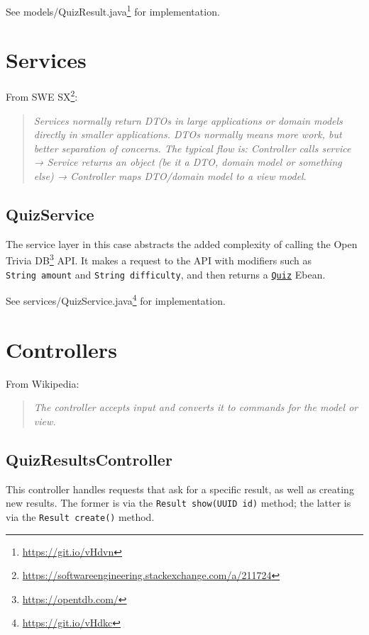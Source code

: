 \documentclass[english,a4paper,]{report}
\renewcommand{\href}[2]{#2\footnote{\url{#1}}}
\begin{document}
See \href{https://git.io/vHdvn}{models/QuizResult.java} for
implementation.

\section{Services}\label{services}

From \href{https://softwareengineering.stackexchange.com/a/211724}{SWE
SX}:

\begin{quote}
\emph{Services normally return DTOs in large applications or domain
models directly in smaller applications. DTOs normally means more work,
but better separation of concerns. The typical flow is: Controller calls
service → Service returns an object (be it a DTO, domain model or
something else) → Controller maps DTO/domain model to a view model}.
\end{quote}

\subsection{QuizService}\label{quizservice}

The service layer in this case abstracts the added complexity of calling
the \href{https://opentdb.com/}{Open Trivia DB} API. It makes a request
to the API with modifiers such as \texttt{String\ amount} and
\texttt{String\ difficulty}, and then returns a
\protect\hyperlink{quiz}{\texttt{Quiz}} Ebean.

See \href{https://git.io/vHdkc}{services/QuizService.java} for
implementation.

\section{Controllers}\label{controllers}

From Wikipedia:

\begin{quote}
\emph{The controller accepts input and converts it to commands for the
model or view.}
\end{quote}

\subsection{QuizResultsController}\label{quizresultscontroller}

This controller handles requests that ask for a specific result, as well
as creating new results. The former is via the
\texttt{Result\ show(UUID\ id)} method; the latter is via the
\texttt{Result\ create()} method.
\end{document}
